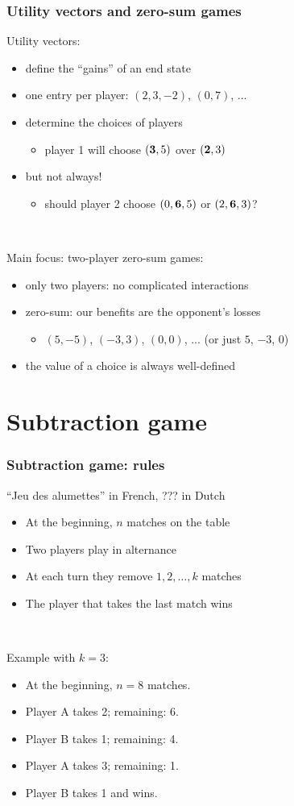 \documentclass[12pt]{beamer}
\begin{document}
\begin{frame}
\frametitle{Utility vectors and zero-sum games}
Utility vectors:
\begin{itemize}
\item define the ``gains'' of an end state
\item one entry per player: $(2,3,-2)$, $(0,7)$, ...
\item determine the choices of players
\begin{itemize} \item player 1 will choose $({\bf 3},5)$ over $({\bf 2},3)$ \end{itemize}
\item but not always!
\begin{itemize} \item should player 2 choose $(0,{\bf 6},5)$ or $(2,{\bf 6},3)$? \end{itemize}
\end{itemize}

~

Main focus: two-player zero-sum games:
\begin{itemize}
\item only two players: no complicated interactions
\item zero-sum: our benefits are the opponent's losses
\begin{itemize} \item $(5,-5)$, $(-3,3)$, $(0,0)$, ... (or just $5$, $-3$, $0$) \end{itemize}
\item the value of a choice is always well-defined
\end{itemize}
\end{frame}


\section{Subtraction game}
\begin{frame}
\frametitle{Subtraction game: rules}
``Jeu des alumettes'' in French, ??? in Dutch
\begin{itemize}
\item At the beginning, $n$ matches on the table
\item Two players play in alternance
\item At each turn they remove $1,2,\ldots,k$ matches
\item The player that takes the last match wins
\end{itemize}

~

Example with $k=3$:
\begin{itemize}
\item At the beginning, $n = 8$ matches.
\item Player A takes 2; remaining: 6.
\item Player B takes 1; remaining: 4.
\item Player A takes 3; remaining: 1.
\item Player B takes 1 and wins.
\end{itemize}
\end{frame}
\end{document}
